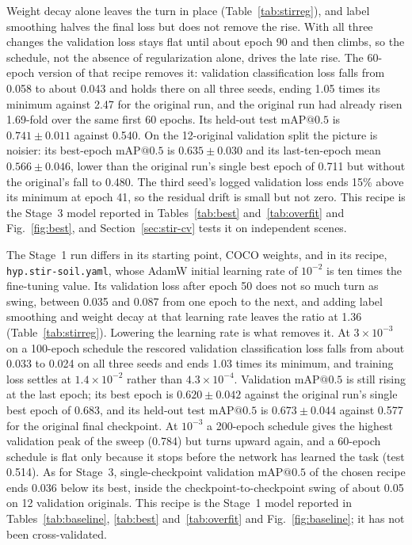 ﻿\documentclass[journal]{IEEEtran}
\begin{document}
Weight decay alone leaves the turn in place (Table~\ref{tab:stirreg}), and label smoothing halves the final loss but does not remove the rise. With all three changes the validation loss stays flat until about epoch 90 and then climbs, so the schedule, not the absence of regularization alone, drives the late rise. The 60-epoch version of that recipe removes it: validation classification loss falls from 0.058 to about 0.043 and holds there on all three seeds, ending 1.05 times its minimum against 2.47 for the original run, and the original run had already risen 1.69-fold over the same first 60 epochs. Its held-out test $\text{mAP@0.5}$ is $0.741 \pm 0.011$ against 0.540. On the 12-original validation split the picture is noisier: its best-epoch $\text{mAP@0.5}$ is $0.635 \pm 0.030$ and its last-ten-epoch mean $0.566 \pm 0.046$, lower than the original run's single best epoch of 0.711 but without the original's fall to 0.480. The third seed's logged validation loss ends 15\% above its minimum at epoch 41, so the residual drift is small but not zero. This recipe is the Stage~3 model reported in Tables~\ref{tab:best} and~\ref{tab:overfit} and Fig.~\ref{fig:best}, and Section~\ref{sec:stir-cv} tests it on independent scenes.

The Stage~1 run differs in its starting point, COCO weights, and in its recipe, \texttt{hyp.stir-soil.yaml}, whose AdamW initial learning rate of $10^{-2}$ is ten times the fine-tuning value. Its validation loss after epoch 50 does not so much turn as swing, between 0.035 and 0.087 from one epoch to the next, and adding label smoothing and weight decay at that learning rate leaves the ratio at 1.36 (Table~\ref{tab:stirreg}). Lowering the learning rate is what removes it. At $3 \times 10^{-3}$ on a 100-epoch schedule the rescored validation classification loss falls from about 0.033 to 0.024 on all three seeds and ends 1.03 times its minimum, and training loss settles at $1.4 \times 10^{-2}$ rather than $4.3 \times 10^{-4}$. Validation $\text{mAP@0.5}$ is still rising at the last epoch; its best epoch is $0.620 \pm 0.042$ against the original run's single best epoch of 0.683, and its held-out test $\text{mAP@0.5}$ is $0.673 \pm 0.044$ against 0.577 for the original final checkpoint. At $10^{-3}$ a 200-epoch schedule gives the highest validation peak of the sweep (0.784) but turns upward again, and a 60-epoch schedule is flat only because it stops before the network has learned the task (test 0.514). As for Stage~3, single-checkpoint validation $\text{mAP@0.5}$ of the chosen recipe ends 0.036 below its best, inside the checkpoint-to-checkpoint swing of about 0.05 on 12 validation originals. This recipe is the Stage~1 model reported in Tables~\ref{tab:baseline}, \ref{tab:best} and~\ref{tab:overfit} and Fig.~\ref{fig:baseline}; it has not been cross-validated.
\end{document}
